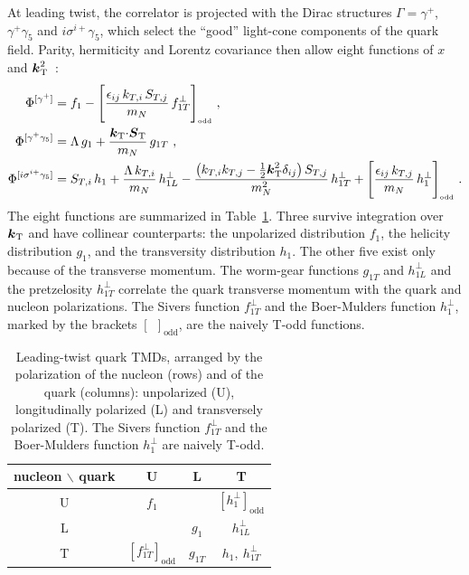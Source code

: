 At leading twist, the correlator is projected with the Dirac structures $\Gamma = \gamma^+$, $\gamma^+\gamma_5$ and $i\sigma^{i+}\gamma_5$, which select the ``good'' light-cone components of the quark field. Parity, hermiticity and Lorentz covariance then allow eight functions of $x$ and $\boldsymbol{k}_{\mathrm T}^2$~\cite{Ralston:1979ys,Tangerman:1994eh,Mulders:1995dh,Boer:1997nt,Goeke:2005hb}:
\begin{align}
  \Phi^{[\gamma^+]} &= f_1 - \Bigg[\frac{\epsilon_{ij}\,k_{T,i}\,S_{T,j}}{m_N}\,f_{1T}^\perp\Bigg]_{\text{\tiny{odd}}} \ , \label{eq:tmd_decomp_f}\\
  \Phi^{[\gamma^+\gamma_5]} &= \Lambda\, g_1 + \frac{\boldsymbol{k}_{\mathrm T}{\cdot}\boldsymbol{S}_{\mathrm T}}{m_N}\,g_{1T} \ , \label{eq:tmd_decomp_g}\\
  \Phi^{[i\sigma^{i+}\gamma_5]} &= S_{T,i}\,h_1 + \frac{\Lambda\,k_{T,i}}{m_N}\,h_{1L}^\perp - \frac{\left(k_{T,i}k_{T,j} - \frac{1}{2}\boldsymbol{k}_{\mathrm T}^2\delta_{ij}\right)S_{T,j}}{m_N^2}\,h_{1T}^\perp + \Bigg[\frac{\epsilon_{ij}\,k_{T,j}}{m_N}\,h_1^\perp\Bigg]_{\text{\tiny{odd}}} \ . \label{eq:tmd_decomp_h}
\end{align}
The eight functions are summarized in Table~\ref{tab:leading_twist_tmds}. Three survive integration over $\boldsymbol{k}_{\mathrm T}$ and have collinear counterparts: the unpolarized distribution $f_1$, the helicity distribution $g_1$, and the transversity distribution $h_1$. The other five exist only because of the transverse momentum. The worm-gear functions $g_{1T}$ and $h_{1L}^\perp$ and the pretzelosity $h_{1T}^\perp$ correlate the quark transverse momentum with the quark and nucleon polarizations. The Sivers function $f_{1T}^\perp$ and the Boer-Mulders function $h_1^\perp$, marked by the brackets $[\ \ ]_{\text{odd}}$, are the naively T-odd functions.

\begin{table}[htpb]
\centering
\renewcommand{\arraystretch}{1.5}
\begin{tabular}{c|ccc}
  \hline
  nucleon $\backslash$ quark & U & L & T \\
  \hline
  U & $f_1$ & & $\left[h_1^\perp\right]_{\text{odd}}$ \\
  L & & $g_1$ & $h_{1L}^\perp$ \\
  T & $\left[f_{1T}^\perp\right]_{\text{odd}}$ & $g_{1T}$ & $h_1,\ h_{1T}^\perp$ \\
  \hline
\end{tabular}
\caption{Leading-twist quark TMDs, arranged by the polarization of the nucleon (rows) and of the quark (columns): unpolarized (U), longitudinally polarized (L) and transversely polarized (T). The Sivers function $f_{1T}^\perp$ and the Boer-Mulders function $h_1^\perp$ are naively T-odd.}
\label{tab:leading_twist_tmds}
\end{table}

